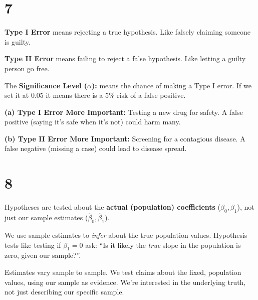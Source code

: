     \section{7}\label{section}

    \textbf{Type I Error} means rejecting a true hypothesis. Like falsely
claiming someone is guilty.

\textbf{Type II Error} means failing to reject a false hypothesis. Like
letting a guilty person go free.

The \textbf{Significance Level (\(\alpha\)):} means the chance of making
a Type I error. If we set it at 0.05 it means there is a 5\% risk of a
false positive.

\textbf{(a) Type I Error More Important:} Testing a new drug for safety.
A false positive (saying it's safe when it's not) could harm many.

\textbf{(b) Type II Error More Important:} Screening for a contagious
disease. A false negative (missing a case) could lead to disease spread.

    \section{8}\label{section}

    Hypotheses are tested about the \textbf{actual (population)
coefficients} (\(\beta_0, \beta_1\)), not just our sample estimates
(\(\hat{\beta}_0, \hat{\beta}_1\)).

We use sample estimates to \emph{infer} about the true population
values. Hypothesis tests like testing if \(\beta_1 = 0\) ask: ``Is it
likely the \emph{true} slope in the population is zero, given our
sample?''.

Estimates vary sample to sample. We test claims about the fixed,
population values, using our sample as evidence. We're interested in the
underlying truth, not just describing our specific sample.
